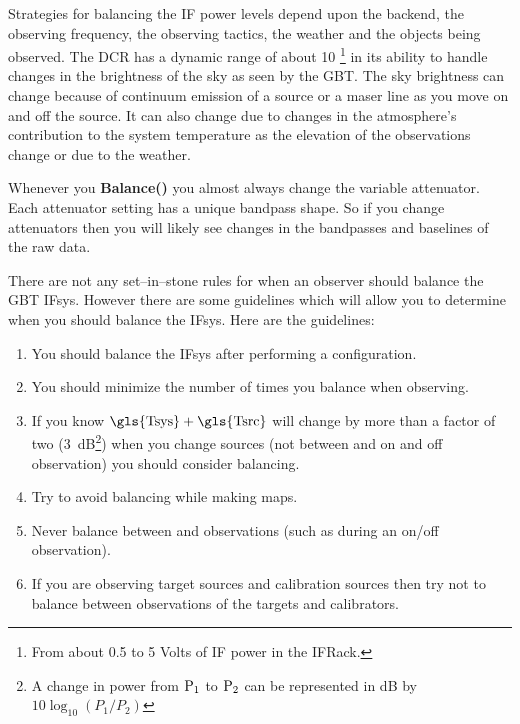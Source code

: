 Strategies for balancing the \gls{IF} power levels depend upon the backend,
the observing frequency, the observing tactics, the weather and the objects
being observed. The \gls{DCR} has a dynamic range of about 10
\footnote{From about 0.5 to 5 Volts of \gls{IF} power in the \gls{IFRack}.}
in its ability to handle changes in the brightness of the sky as seen by the 
\gls{GBT}. The sky brightness can change because of continuum emission of a
source or a maser line as you move on and off the source.  It can also change
due to changes in the atmosphere's contribution to the system temperature
as the elevation of the observations change or due to the weather.

Whenever you {\bfseries{\textcolor{pythonKeywords}{Balance}}()} you almost
always change the variable attenuator.  Each attenuator setting has a
unique bandpass shape. So if you change attenuators then you will likely see
changes in the bandpasses and \glspl{baseline} of the raw data.  

There are not any set--in--stone rules for when an observer should
balance the \gls{GBT} \gls{IFsys}.  However there are some guidelines which
will allow you to determine when you should balance the \gls{IFsys}.  Here are
the guidelines:

\begin{enumerate}[label=\bfseries{\arabic*.},leftmargin=*,
labelindent=\parindent]
\item You should balance the \gls{IFsys} after performing a configuration.  
\item You should minimize the number of times you balance when observing.
\item If you know ${\rm \gls{Tsys} + \gls{Tsrc}}$ will change by more than
a factor of two (3~dB\footnote{A change in power from ${\rm P_1}$ 
to ${\rm P_2}$ can be represented in dB by ${10 \log_{10}{(P_1/P_2)}}$})
when you change sources (not between and on and off observation) you should
consider balancing.
\item Try to avoid balancing while making maps.
\item Never balance between  and  observations (such
as during an on/off observation).
\item If you are observing target sources and calibration sources then
try not to balance between observations of the targets and calibrators.
\end{enumerate}

